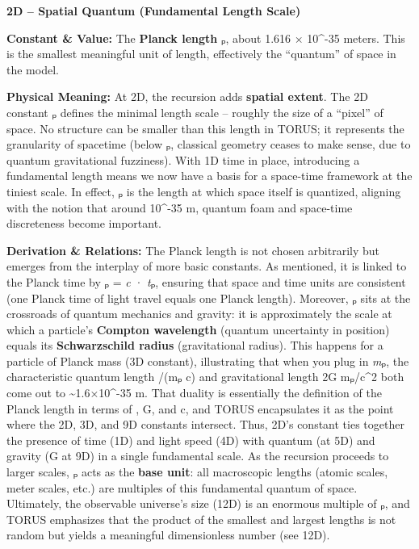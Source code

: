 \documentclass[
]{article}
\begin{document}
\textbf{2D -- Spatial Quantum (Fundamental Length Scale)}

\textbf{Constant \& Value:} The \textbf{Planck length} \emph{\ell}ₚ, about
1.616 × 10\^{}-35 meters\hspace{0pt}. This is the smallest meaningful
unit of length, effectively the ``quantum'' of space in the model.

\textbf{Physical Meaning:} At 2D, the recursion adds \textbf{spatial
extent}. The 2D constant \emph{\ell}ₚ defines the minimal length scale --
roughly the size of a ``pixel'' of space. No structure can be smaller
than this length in TORUS; it represents the granularity of spacetime
(below \emph{\ell}ₚ, classical geometry ceases to make sense, due to
quantum gravitational fuzziness). With 1D time in place, introducing a
fundamental length means we now have a basis for a space-time framework
at the tiniest scale. In effect, \emph{\ell}ₚ is the length at which space
itself is quantized, aligning with the notion that around 10\^{}-35 m,
quantum foam and space-time discreteness become important.

\textbf{Derivation \& Relations:} The Planck length is not chosen
arbitrarily but emerges from the interplay of more basic constants. As
mentioned, it is linked to the Planck time by \emph{\ell}ₚ = \emph{c} ·
\emph{t}ₚ, ensuring that space and time units are consistent (one Planck
time of light travel equals one Planck length). Moreover, \emph{\ell}ₚ sits
at the crossroads of quantum mechanics and gravity: it is approximately
the scale at which a particle's \textbf{Compton wavelength} (quantum
uncertainty in position) equals its \textbf{Schwarzschild radius}
(gravitational radius). This happens for a particle of Planck mass (3D
constant), illustrating that when you plug in \emph{m}ₚ, the
characteristic quantum length \hbar/(mₚ c) and gravitational length 2G
mₚ/c\^{}2 both come out to \textasciitilde1.6×10\^{}-35 m\hspace{0pt}.
That duality is essentially the definition of the Planck length in terms
of \hbar, G, and c, and TORUS encapsulates it as the point where the 2D, 3D,
and 9D constants intersect. Thus, 2D's constant ties together the
presence of time (1D) and light speed (4D) with quantum (\hbar at 5D) and
gravity (G at 9D) in a single fundamental scale\hspace{0pt}. As the
recursion proceeds to larger scales, \emph{\ell}ₚ acts as the \textbf{base
unit}: all macroscopic lengths (atomic scales, meter scales, etc.) are
multiples of this fundamental quantum of space. Ultimately, the
observable universe's size (12D) is an enormous multiple of \emph{\ell}ₚ,
and TORUS emphasizes that the product of the smallest and largest
lengths is not random but yields a meaningful dimensionless number (see
12D)\hspace{0pt}.
\end{document}
